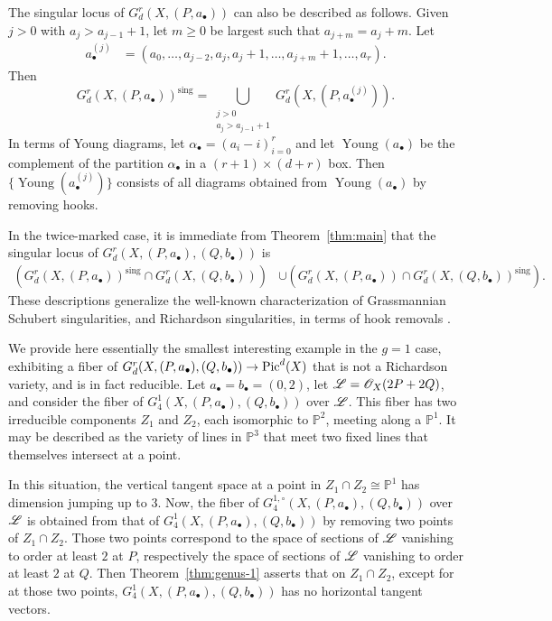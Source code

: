 \documentclass{amsart}
\begin{document}
\begin{rem}\label{rem:hook}
The singular locus of $G^r_d(X,(P,a_\bullet))$ can also be described as follows.  Given $j>0$ with $a_j > a_{j-1}+1$, let $m\ge 0$ be largest such that $a_{j+m} = a_j + m$. 
Let 
\begin{align*}
a^{(j)}_\bullet &= (a_0,\ldots,a_{j-2},a_{j},a_j\!+\!1,\ldots,a_{j+m}\!+\!1,\ldots,a_r).
\end{align*}
\noindent Then $$G^r_d(X,(P,a_\bullet))^\text{sing} = \!\!\bigcup_{\substack{j>0\\a_j>a_{j-1}+1}} \!\!G^r_d(X,(P,a^{(j)}_\bullet)).$$
In terms of Young diagrams, let $\alpha_\bullet = (a_i\!-\! i)_{i=0}^r$ and let $\operatorname{Young}(a_\bullet)$ be the complement of the partition $\alpha_\bullet$ in a $(r\!+\!1)\times (d\!+\!r)$ box.  Then $\{\operatorname{Young}(a^{(j)}_\bullet)\}$ consists of all diagrams obtained from $\operatorname{Young}(a_\bullet)$ by removing hooks.  

In the twice-marked case, it is immediate from Theorem~\ref{thm:main} that the singular locus of $G^r_d(X,(P,a_\bullet), (Q,b_\bullet))$ is
\begin{align*}
\left(G^r_d(X,(P,a_\bullet))^\text{sing} \cap G^r_d(X, (Q,b_\bullet))\right)  
&\cup  
\left(G^r_d(X,(P,a_\bullet)) \cap G^r_d(X, (Q,b_\bullet))^\text{sing}\right).
\end{align*}
These descriptions generalize the well-known characterization of Grassmannian Schubert singularities, and Richardson singularities, in terms of hook removals \cite[Theorem 9.3.1]{b-l2}.
\end{rem}


\begin{ex}\label{ex:0202}
We provide here essentially the smallest interesting example in the $g=1$ case, exhibiting a fiber of $G^r_d(X, (P, a_\bullet), (Q,b_\bullet))\to \operatorname{Pic}^d(X)$ that is not a Richardson variety, and is in fact reducible.  Let $a_\bullet = b_\bullet = (0,2)$, let ${\mathscr L} = {\mathscr O}_X(2P + 2Q)$, and consider the fiber of $G^1_4(X, (P, a_\bullet), (Q,b_\bullet))$ over ${\mathscr L}$.  This fiber has two irreducible components $Z_1$ and $Z_2$, each isomorphic to $\mathbb{P}^2$, meeting along a $\mathbb{P}^1$. It may be described as the variety of lines in $\mathbb{P}^3$ that meet two fixed lines that themselves intersect at a point.  

In this situation, the vertical tangent space at a point in $Z_1\cap Z_2\cong \mathbb{P}^1$ has dimension jumping up to $3$.  Now, the fiber of $G^{1,\circ}_4(X, (P, a_\bullet), (Q,b_\bullet))$ over ${\mathscr L}$ is obtained from that of $G^1_4(X, (P, a_\bullet), (Q,b_\bullet))$ by removing two points of $Z_1\cap Z_2$. Those two points correspond to the space of sections of ${\mathscr L}$ vanishing to order at least $2$ at $P$, respectively the space of sections of ${\mathscr L}$ vanishing to order at least $2$ at $Q$.  
Then Theorem~\ref{thm:genus-1} asserts that on $Z_1\cap Z_2$, except for at those two points, $G^1_4(X, (P, a_\bullet), (Q,b_\bullet))$ has no horizontal tangent vectors.
\end{ex}
\end{document}
